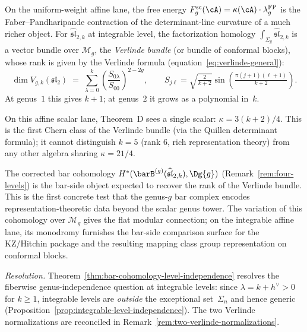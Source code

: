 \begin{remark}%
\label{rem:verlinde-vs-kappa}%
%
On the uniform-weight affine lane, the free energy
$F_g^{\mathrm{sc}}(\cA)=\kappa(\cA) \cdot \lambda_g^{\mathrm{FP}}$ is the
Faber--Pandharipande contraction of the determinant-line curvature
of a much richer object. For
$\widehat{\mathfrak{sl}}_{2,k}$ at integrable level, the
factorization homology $\int_{\Sigma_g}\!\widehat{\mathfrak{sl}}_{2,k}$
is a vector bundle over $\mathcal{M}_g$, the \emph{Verlinde bundle}
(or bundle of conformal blocks), whose rank is given by the
Verlinde formula
(equation~\eqref{eq:verlinde-general}):
\[
\dim V_{g,k}(\mathfrak{sl}_2)
\;=\; \sum_{\lambda=0}^{k} \left(\frac{S_{0\lambda}}{S_{00}}\right)^{2-2g},
\qquad S_{j\ell} = \sqrt{\tfrac{2}{k+2}}
\sin\!\left(\tfrac{\pi(j+1)(\ell+1)}{k+2}\right).
\]
At genus~$1$ this gives $k{+}1$; at genus~$2$ it
grows as a polynomial in~$k$.

On this affine scalar lane, Theorem~D sees a single scalar:
$\kappa = 3(k{+}2)/4$. This is the first Chern class of the
Verlinde bundle (via the Quillen determinant formula);
it cannot distinguish $k = 5$ (rank $6$, rich representation
theory) from any other algebra sharing
$\kappa = 21/4$.

The corrected bar cohomology
$H^*(\barB^{(g)}(\widehat{\mathfrak{sl}}_{2,k}), \Dg{g})$
(Remark~\ref{rem:four-levels}) is the bar-side object expected to
recover the rank of the Verlinde bundle. This is the first concrete
test that the genus-$g$ bar complex encodes representation-theoretic
data beyond the scalar genus tower.
The variation of this cohomology over $\mathcal{M}_g$
gives the flat modular connection; on the integrable affine lane,
its monodromy furnishes the bar-side comparison surface for the
KZ/Hitchin package and the resulting
mapping class group representation on conformal blocks.

\smallskip\noindent
\emph{Resolution.}
Theorem~\ref{thm:bar-cohomology-level-independence} resolves
the fiberwise genus-independence question at integrable levels:
since $\lambda = k + h^\vee > 0$ for $k \ge 1$, integrable
levels are \emph{outside} the exceptional set~$\Sigma_n$
and hence generic (Proposition~\ref{prop:integrable-level-independence}).
The two Verlinde normalizations are reconciled in
Remark~\ref{rem:two-verlinde-normalizations}.
\end{remark}

